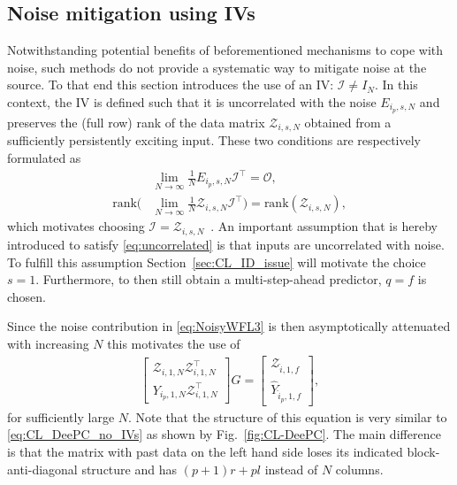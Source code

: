 \subsection{Noise mitigation using \acl{IVs}}
Notwithstanding potential benefits of beforementioned mechanisms to cope with noise, such methods do not provide a systematic way to mitigate noise at the source. To that end this section introduces the use of an \ac{IV}: $\mathcal{I}\neq I_N$. In this context, the \ac{IV} is defined such that it is uncorrelated with the noise $E_{i_p,s,N}$ and preserves the (full row) rank of the data matrix $\mathcal{Z}_{i,s,N}$ obtained from a sufficiently persistently exciting input. These two conditions are respectively formulated as
%
\begin{align}
    &\lim_{N\rightarrow\infty} \frac{1}{N}E_{i_p,s,N}\mathcal{I}^\top = \mathcal{O},\label{eq:uncorrelated}\\
    \text{rank}\biggl(&\lim_{N\rightarrow\infty} \frac{1}{N}\mathcal{Z}_{i,s,N}\mathcal{I}^\top\biggl) =  \text{rank}(\mathcal{Z}_{i,s,N}),\label{eq:rankconservation}
\end{align}
%
which motivates choosing $\mathcal{I}=\mathcal{Z}_{i,s,N}$~\cite[Chapt. 9.6]{Verhaegen2007a}. An important assumption that is hereby introduced to satisfy \eqref{eq:uncorrelated} is that inputs are uncorrelated with noise. To fulfill this assumption Section~\ref{sec:CL_ID_issue} will motivate the choice $s=1$. Furthermore, to then still obtain a multi-step-ahead predictor, $q=f$ is chosen.

Since the noise contribution in \eqref{eq:NoisyWFL3} is then asymptotically attenuated with increasing $N$ this motivates the use of
\begin{align}\label{eq:CL_DeePC_with_IV}
    \begin{bmatrix}
   \mathcal{Z}_{i,1,N}\mathcal{Z}_{i,1,N}^\top\\
   \hline
   Y_{i_p,1,N}\mathcal{Z}_{i,1,N}^\top
    \end{bmatrix}
G =
\begin{bmatrix}
    \mathcal{Z}_{\hat{i},1,f}\\
    \hline
    \widehat{Y}_{\hat{i}_p,1,f}
\end{bmatrix},
\end{align}
for sufficiently large $N$. Note that the structure of this equation is very similar to \eqref{eq:CL_DeePC_no_IVs} as shown by Fig.~\ref{fig:CL-DeePC}. The main difference is that the matrix with past data on the left hand side loses its indicated block-anti-diagonal structure and has $(p+1)r+pl$ instead of $N$ columns.

